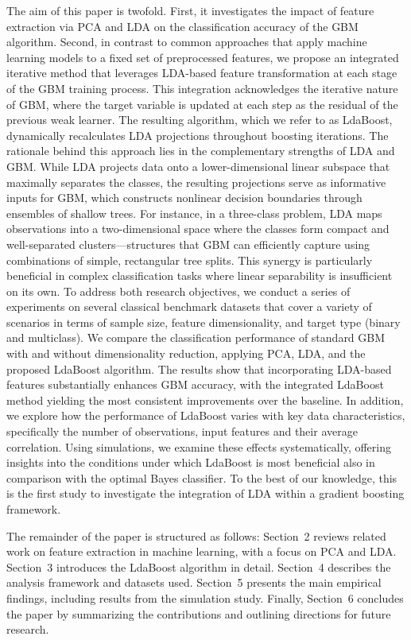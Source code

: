\documentclass[11pt,a4paper]{article}
\begin{document}
The aim of this paper is twofold. First, it investigates the impact of feature extraction via PCA and LDA on the classification accuracy of the GBM algorithm. Second, in contrast to common approaches that apply machine learning models to a fixed set of preprocessed features, we propose an integrated iterative method that leverages LDA-based feature transformation at each stage of the GBM training process. This integration acknowledges the iterative nature of GBM, where the target variable is updated at each step as the residual of the previous weak learner. The resulting algorithm, which we refer to as LdaBoost, dynamically recalculates LDA projections throughout boosting iterations.
The rationale behind this approach lies in the complementary strengths of LDA and GBM. While LDA projects data onto a lower-dimensional linear subspace that maximally separates the classes, the resulting projections serve as informative inputs for GBM, which constructs nonlinear decision boundaries through ensembles of shallow trees. For instance, in a three-class problem, LDA maps observations into a two-dimensional space where the classes form compact and well-separated clusters---structures that GBM can efficiently capture using combinations of simple, rectangular tree splits. This synergy is particularly beneficial in complex classification tasks where linear separability is insufficient on its own.
To address both research objectives, we conduct a series of experiments on several classical benchmark datasets that cover a variety of scenarios in terms of sample size, feature dimensionality, and target type (binary and multiclass). We compare the classification performance of standard GBM with and without dimensionality reduction, applying PCA, LDA, and the proposed LdaBoost algorithm. The results show that incorporating LDA-based features substantially enhances GBM accuracy, with the integrated LdaBoost method yielding the most consistent improvements over the baseline.
In addition, we explore how the performance of LdaBoost varies with key data characteristics, specifically the number of observations, input features and their average correlation. Using simulations, we examine these effects systematically, offering insights into the conditions under which LdaBoost is most beneficial also in comparison with the optimal Bayes classifier. To the best of our knowledge, this is the first study to investigate the integration of LDA within a gradient boosting framework.

The remainder of the paper is structured as follows: Section~2 reviews related work on feature extraction in machine learning, with a focus on PCA and LDA. Section~3 introduces the LdaBoost algorithm in detail. Section~4 describes the analysis framework and datasets used. Section~5 presents the main empirical findings, including results from the simulation study. Finally, Section~6 concludes the paper by summarizing the contributions and outlining directions for future research.
\end{document}
